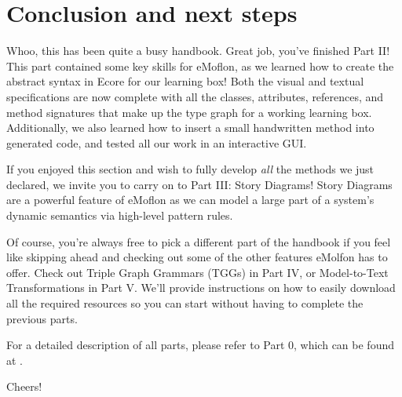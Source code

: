 \newpage
\section{Conclusion and next steps}
\genHeader

\vspace{0.5cm}

Whoo, this has been quite a busy handbook. Great job, you've finished Part II! This part contained some key skills for eMoflon, as we learned how to create
the abstract syntax in Ecore for our learning box! Both the visual and textual specifications are now complete with all the classes, attributes, references, and
method signatures that make up the type graph for a working learning box. Additionally, we also learned how to insert a small handwritten method into generated
code, and tested all our work in an interactive GUI.

If you enjoyed this section and wish to fully develop \emph{all} the methods we just declared, we invite you to carry on to Part III: Story
Diagrams! Story Diagrams are a powerful feature of eMoflon as we can model a large part of a system's dynamic semantics via high-level pattern rules. 


Of course, you're always free to pick a different part of the handbook if you feel like skipping ahead and checking out some of the other features eMolfon has
to offer. Check out Triple Graph Grammars (TGGs)  in Part IV, or Model-to-Text Transformations in Part V. We'll provide instructions on how to easily download
all the required resources so you can start without having to complete the previous parts.

For a detailed description of all parts, please refer to Part 0, which can be found at \dlPartZero.

\vspace{1.0cm}

Cheers!